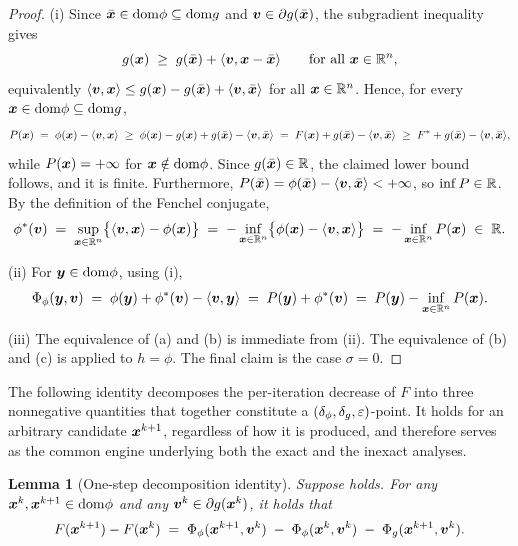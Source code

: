 \documentclass[english]{article}
\newtheorem{lemma}{Lemma}[section]
\begin{document}
\begin{proof}
(i) Since $\bar{\bm{x}}\in\mathrm{dom}\phi\subseteq\mathrm{dom} g$ and
$\bm{v}\in\partial g(\bar{\bm{x}})$, the subgradient inequality gives
\begin{equation}
    g(\bm{x})\;\ge\;g(\bar{\bm{x}})+\langle\bm{v},\bm{x}-\bar{\bm{x}}\rangle
    \qquad\text{for all }\bm{x}\in\mathbb{R}^n,
    \label{eq:g-subgrad-at-xbar}
\end{equation}
equivalently
$\langle\bm{v},\bm{x}\rangle\le g(\bm{x})-g(\bar{\bm{x}})+\langle\bm{v},\bar{\bm{x}}\rangle$
for all $\bm{x}\in\mathbb{R}^n$. Hence, for every $\bm{x}\in\mathrm{dom}\phi\subseteq\mathrm{dom} g$,
\[
    P(\bm{x})
    \;=\;
    \phi(\bm{x})-\langle\bm{v},\bm{x}\rangle
    \;\ge\;
    \phi(\bm{x})-g(\bm{x})+g(\bar{\bm{x}})-\langle\bm{v},\bar{\bm{x}}\rangle
    \;=\;
    F(\bm{x})+g(\bar{\bm{x}})-\langle\bm{v},\bar{\bm{x}}\rangle
    \;\ge\;
    F^\ast+g(\bar{\bm{x}})-\langle\bm{v},\bar{\bm{x}}\rangle,
\]
while $P(\bm{x})=+\infty$ for $\bm{x}\notin\mathrm{dom}\phi$. Since $g(\bar{\bm{x}})\in\mathbb{R}$,
the claimed lower bound follows, and it is finite. Furthermore,
$P(\bar{\bm{x}})=\phi(\bar{\bm{x}})-\langle\bm{v},\bar{\bm{x}}\rangle<+\infty$, so
$\inf\limits P\in\mathbb{R}$. By the definition of the Fenchel conjugate,
\[
    \phi^*(\bm{v})
    \;=\;
    \sup\limits_{\bm{x}\in\mathbb{R}^n}\bigl\{\langle\bm{v},\bm{x}\rangle-\phi(\bm{x})\bigr\}
    \;=\;
    -\inf\limits_{\bm{x}\in\mathbb{R}^n}\bigl\{\phi(\bm{x})-\langle\bm{v},\bm{x}\rangle\bigr\}
    \;=\;
    -\inf\limits_{\bm{x}\in\mathbb{R}^n}P(\bm{x})\;\in\;\mathbb{R} .
\]

(ii) For $\bm{y}\in\mathrm{dom}\phi$, using (i),
\[
    \Phi_\phi(\bm{y},\bm{v})
    \;=\;
    \phi(\bm{y})+\phi^*(\bm{v})-\langle\bm{v},\bm{y}\rangle
    \;=\;
    P(\bm{y})+\phi^*(\bm{v})
    \;=\;
    P(\bm{y})-\inf\limits_{\bm{x}\in\mathbb{R}^n}P(\bm{x}).
\]

(iii) The equivalence of (a) and (b) is immediate from (ii). The
equivalence of (b) and (c) is  applied to
$h=\phi$. The final claim is the case $\sigma=0$.
\end{proof}


The following identity decomposes the per-iteration decrease of $F$
into three nonnegative quantities that together constitute a
$(\delta_\phi,\delta_g,\varepsilon)$-point. It holds for an arbitrary
candidate $\bm{x}^{k+1}$, regardless of how it is produced, and therefore
serves as the common engine underlying both the exact and the
inexact analyses.

\begin{lemma}[One-step decomposition identity]
\label{lem:dca-one-step-identity}
Suppose  holds. For any
$\bm{x}^k,\bm{x}^{k+1}\in\mathrm{dom}\phi$ and any $\bm{v}^k\in\partial g(\bm{x}^k)$, it holds that
\begin{equation}
    F(\bm{x}^{k+1})-F(\bm{x}^k)
    \;=\;
    \Phi_\phi(\bm{x}^{k+1},\bm{v}^k)
    \;-\;
    \Phi_\phi(\bm{x}^k,\bm{v}^k)
    \;-\;
    \Phi_g(\bm{x}^{k+1},\bm{v}^k).
    \label{eq:dca-one-step-identity}
\end{equation}
\end{lemma}
\end{document}
